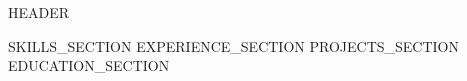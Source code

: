 \documentclass[10pt,letterpaper]{article}
\begin{document}
\fontsize{9.25}{11.6}\selectfont
\begin{center}
{{HEADER}}
\end{center}
\vspace{-2pt}
{{SKILLS_SECTION}}
{{EXPERIENCE_SECTION}}
{{PROJECTS_SECTION}}
{{EDUCATION_SECTION}}
\end{document}

